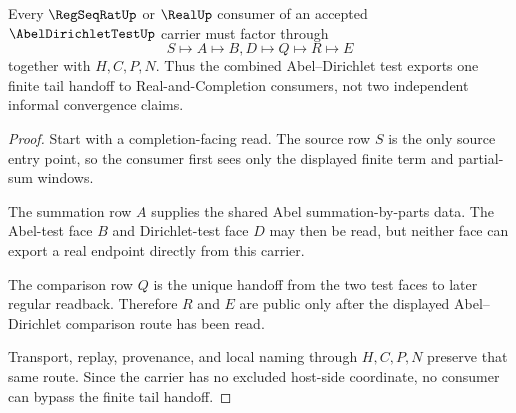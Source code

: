 \begin{theorem}
\label{thm:abel-dirichlet-test-tail-handoff}
Every $\RegSeqRatUp$ or $\RealUp$ consumer of an accepted $\AbelDirichletTestUp$ carrier must factor through
$$
S \longmapsto A \longmapsto B,D \longmapsto Q \longmapsto R \longmapsto E
$$
together with $H,C,P,N$. Thus the combined Abel--Dirichlet test exports one finite tail handoff to Real-and-Completion consumers, not two independent informal convergence claims.
\end{theorem}
\begin{proof}
Start with a completion-facing read. The source row $S$ is the only source entry point, so the consumer first sees only the displayed finite term and partial-sum windows.

The summation row $A$ supplies the shared Abel summation-by-parts data. The Abel-test face $B$ and Dirichlet-test face $D$ may then be read, but neither face can export a real endpoint directly from this carrier.

The comparison row $Q$ is the unique handoff from the two test faces to later regular readback. Therefore $R$ and $E$ are public only after the displayed Abel--Dirichlet comparison route has been read.

Transport, replay, provenance, and local naming through $H,C,P,N$ preserve that same route. Since the carrier has no excluded host-side coordinate, no consumer can bypass the finite tail handoff.
\end{proof}





